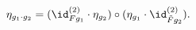 \begin{equation}
  \eta_{g_1\cdot g_2} =
  (\id^{(2)}_{Fg_1}\cdot\eta_{g_2})\circ(\eta_{g_1}\cdot\id^{(2)}_{\tilde Fg_2}).
\end{equation}

